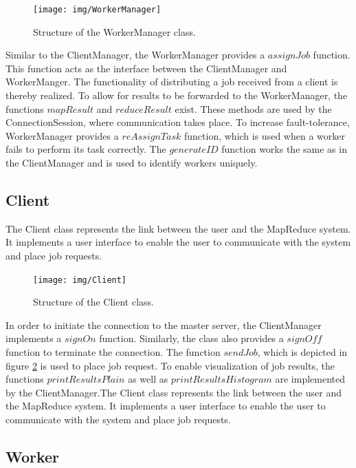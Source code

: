 \documentclass[12pt, letterpaper]{article}
\begin{document}
\begin{figure}[h]
	\centering
	\texttt{[image: img/WorkerManager]}
	\caption{Structure of the WorkerManager class.}
	\label{fig:classes_WorkerManager}
\end{figure}

Similar to the ClientManager, the WorkerManager provides a $assignJob$ function. This function acts as the interface between the ClientManager and WorkerManger. The functionality of distributing a job received from a client is thereby realized. To allow for results to be forwarded to the WorkerManager, the functions $mapResult$ and $reduceResult$ exist. These methods are used by the ConnectionSession, where communication takes place.\newline
To increase fault-tolerance, WorkerManager provides a $reAssignTask$ function, which is used when a worker fails to perform its task correctly. The $generateID$ function works the same as in the ClientManager and is used to identify workers uniquely.  

\subsection{Client}

The Client class represents the link between the user and the MapReduce system. It implements a user interface to enable the user to communicate with the system and place job requests. 

\begin{figure}[h]
	\centering
	\texttt{[image: img/Client]}
	\caption{Structure of the Client class.}
	\label{fig:classes_Client}
\end{figure}

In order to initiate the connection to the master server, the ClientManager implements a $signOn$ function. Similarly, the class also provides a $signOff$ function to terminate the connection. The function $sendJob$, which is depicted in figure \ref{fig:classes_Client} is used to place job request. To enable visualization of job results, the functions $printResultsPlain$ as well as $printResultsHistogram$ are implemented by the ClientManager.The Client class represents the link between the user and the MapReduce system. It implements a user interface to enable the user to communicate with the system and place job requests. 

\subsection{Worker}
\end{document}
